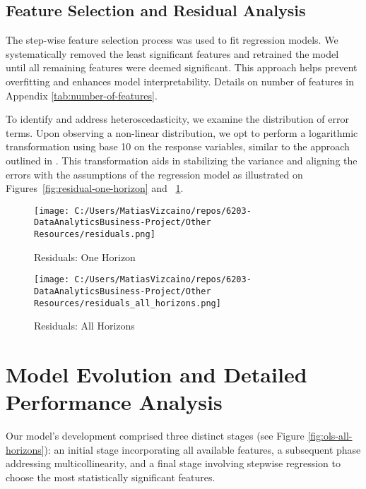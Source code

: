 \documentclass{article}
\begin{document}
\subsection{\textbf{Feature Selection and Residual Analysis}}

The step-wise feature selection process was used to fit regression models. We systematically removed the least significant features and retrained the model until all remaining features were deemed significant. This approach helps prevent overfitting and enhances model interpretability. Details on number of features in Appendix \ref{tab:number-of-features}.

To identify and address heteroscedasticity, we examine the distribution of error terms. Upon observing a non-linear distribution, we opt to perform a logarithmic transformation using base 10 on the response variables, similar to the approach outlined in \cite{Miori2023}. This transformation aids in stabilizing the variance and aligning the errors with the assumptions of the regression model as illustrated on Figures~\ref{fig:residual-one-horizon} and ~\ref{fig:residual-all-horizons}.

\begin{figure}[htbp]
  \begin{minipage}{0.5\textwidth}
  \centering
  \texttt{[image: C:/Users/MatiasVizcaino/repos/6203-DataAnalyticsBusiness-Project/Other Resources/residuals.png]}
  \caption{Residuals: One Horizon}
  \label{fig:residual-one-horizon}
  \end{minipage}
  \begin{minipage}{0.45\textwidth}
  \centering
  \texttt{[image: C:/Users/MatiasVizcaino/repos/6203-DataAnalyticsBusiness-Project/Other Resources/residuals\_all\_horizons.png]}
  \caption{Residuals: All Horizons}
  \label{fig:residual-all-horizons}
  \end{minipage}
  \end{figure}

\section{Model Evolution and Detailed Performance Analysis}

Our model's development comprised three distinct stages (see Figure \ref{fig:ols-all-horizons}): an initial stage incorporating all available features, a subsequent phase addressing multicollinearity, and a final stage involving stepwise regression to choose the most statistically significant features.
\end{document}
